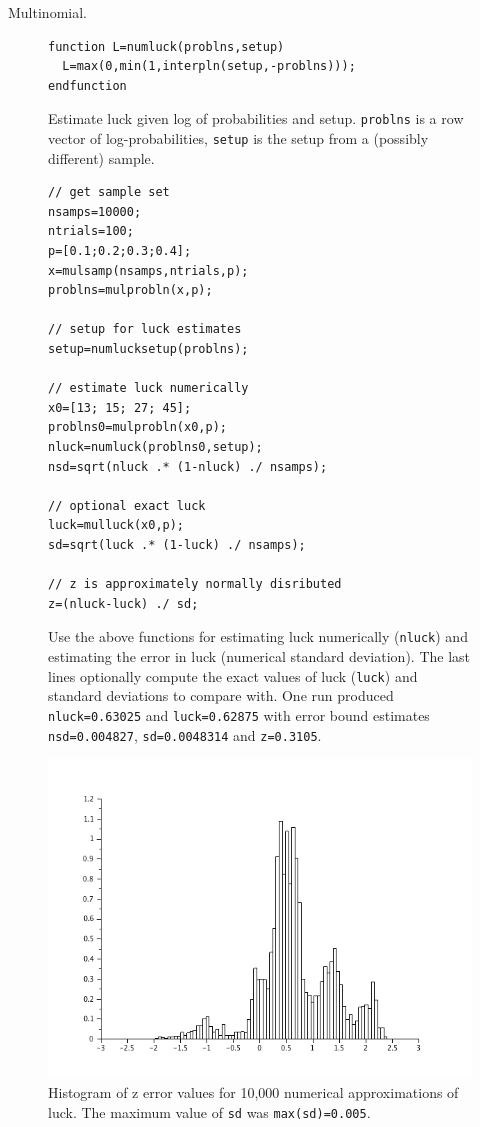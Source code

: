 \begin{example}{Multinomial.}
\begin{figure}
\caption{\label{fig:numluck}Estimate luck given log of probabilities and setup.  {\tt problns} is a row vector of log-probabilities, {\tt setup} is the setup from a (possibly different) sample.}
\lstset{language=Scilab}
\begin{lstlisting}
function L=numluck(problns,setup)
  L=max(0,min(1,interpln(setup,-problns)));
endfunction
\end{lstlisting}
\end{figure}

\begin{figure}
\caption{\label{fig:numluckprog}Use the above functions for estimating luck numerically ({\tt nluck}) and estimating the error in luck (numerical standard deviation).  The last lines optionally compute the exact values of luck ({\tt luck}) and standard deviations to compare with.  One run produced {\tt nluck=0.63025} and {\tt luck=0.62875} with error bound estimates {\tt nsd=0.004827}, {\tt sd=0.0048314} and {\tt z=0.3105}.}
\lstset{language=Scilab}
\begin{lstlisting}
// get sample set
nsamps=10000;
ntrials=100;
p=[0.1;0.2;0.3;0.4];
x=mulsamp(nsamps,ntrials,p);
problns=mulprobln(x,p);

// setup for luck estimates
setup=numlucksetup(problns);

// estimate luck numerically
x0=[13; 15; 27; 45];
problns0=mulprobln(x0,p);
nluck=numluck(problns0,setup);
nsd=sqrt(nluck .* (1-nluck) ./ nsamps);

// optional exact luck
luck=mulluck(x0,p);
sd=sqrt(luck .* (1-luck) ./ nsamps);

// z is approximately normally disributed
z=(nluck-luck) ./ sd;
\end{lstlisting}
\end{figure}

\begin{figure}
  \caption{Histogram of z error values for 10,000 numerical approximations of luck.  The maximum value of {\tt sd} was {\tt max(sd)=0.005}.}
  \centering
    \includegraphics[width=1.00\textwidth]{img/compz.png}
\end{figure}

\end{example}
